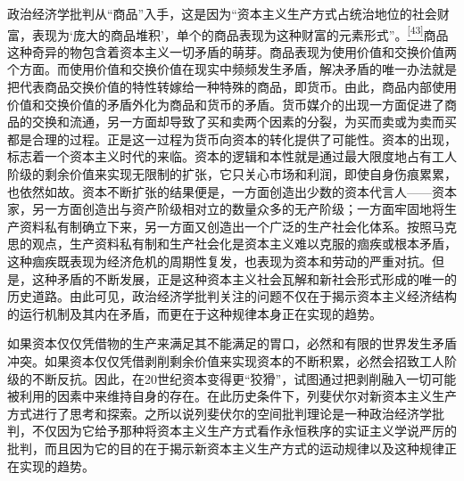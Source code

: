 \documentclass[UTF8, fontset = sourcesans, a4paper, oneside, zihao =
-4, scheme=chinese, no-math, space=true]{ctexbook}
\begin{document}
政治经济学批判从``商品''入手，这是因为``资本主义生产方式占统治地位的社会财富，表现为`庞大的商品堆积'，单个的商品表现为这种财富的元素形式''。\protect\hypertarget{part0010_split_002.htmlux5cux23w43}{}{}\protect\hyperlink{part0010_split_002.htmlux5cux23m43}{\textsuperscript{{[}43{]}}}商品这种奇异的物包含着资本主义一切矛盾的萌芽。商品表现为使用价值和交换价值两个方面。而使用价值和交换价值在现实中频频发生矛盾，解决矛盾的唯一办法就是把代表商品交换价值的特性转嫁给一种特殊的商品，即货币。由此，商品内部使用价值和交换价值的矛盾外化为商品和货币的矛盾。货币媒介的出现一方面促进了商品的交换和流通，另一方面却导致了买和卖两个因素的分裂，为买而卖或为卖而买都是合理的过程。正是这一过程为货币向资本的转化提供了可能性。资本的出现，标志着一个资本主义时代的来临。资本的逻辑和本性就是通过最大限度地占有工人阶级的剩余价值来实现无限制的扩张，它只关心市场和利润，即使自身伤痕累累，也依然如故。资本不断扩张的结果便是，一方面创造出少数的资本代言人------资本家，另一方面创造出与资产阶级相对立的数量众多的无产阶级；一方面牢固地将生产资料私有制确立下来，另一方面又创造出一个广泛的生产社会化体系。按照马克思的观点，生产资料私有制和生产社会化是资本主义难以克服的痼疾或根本矛盾，这种痼疾既表现为经济危机的周期性复发，也表现为资本和劳动的严重对抗。但是，这种矛盾的不断发展，正是这种资本主义社会瓦解和新社会形式形成的唯一的历史道路。由此可见，政治经济学批判关注的问题不仅在于揭示资本主义经济结构的运行机制及其内在矛盾，而更在于这种规律本身正在实现的趋势。

如果资本仅仅凭借物的生产来满足其不能满足的胃口，必然和有限的世界发生矛盾冲突。如果资本仅仅凭借剥削剩余价值来实现资本的不断积累，必然会招致工人阶级的不断反抗。因此，在20世纪资本变得更``狡猾''，试图通过把剥削融入一切可能被利用的因素中来维持自身的存在。在此历史条件下，列斐伏尔对新资本主义生产方式进行了思考和探索。之所以说列斐伏尔的空间批判理论是一种政治经济学批判，不仅因为它给予那种将资本主义生产方式看作永恒秩序的实证主义学说严厉的批判，而且因为它的目的在于揭示新资本主义生产方式的运动规律以及这种规律正在实现的趋势。
\end{document}
